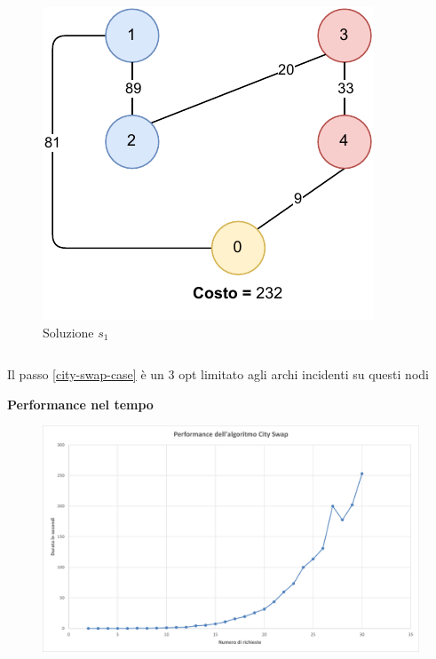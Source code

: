 \documentclass[9pt]{beamer}
\begin{document}
\begin{frame}{\subsecname}
{\begin{columns}[T,onlytextwidth]
\begin{figure}[h]
		\includegraphics[height=0.25\textheight]
		{../images/graph-greedy-pickup-first-solution-tsppd-with-two-customers}	
		\caption{Soluzione $s_1$}
		\end{figure}
	\end{columns}

	Il passo \ref{city-swap-case} è un 3 opt limitato agli archi incidenti su questi nodi
	}
\framebreak

	\textbf{Performance nel tempo}
      	\begin{figure}[h]
	\centering
	\includegraphics[width=\textwidth]
	{../charts/10 Performance dell'algoritmo City Swap}
	\end{figure}

\end{frame}
\end{document}
